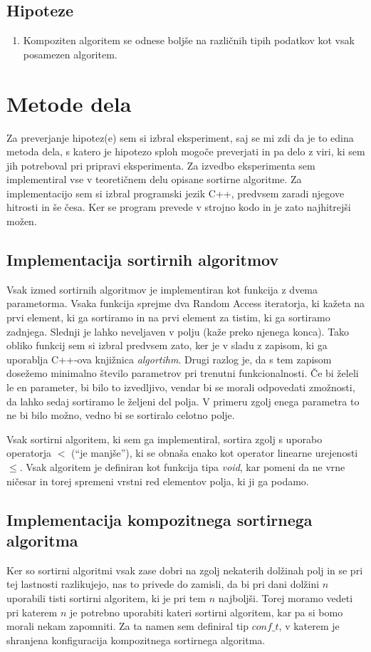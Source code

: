 \documentclass[a4paper,oneside]{article}
\begin{document}
\subsection{Hipoteze}
\begin{enumerate}
  \item Kompoziten algoritem se odnese boljše na različnih tipih podatkov kot vsak
    posamezen algoritem.
\end{enumerate}
\section{Metode dela}
Za preverjanje hipotez(e) sem si izbral eksperiment, saj se mi zdi da je to edina metoda
dela, s katero je hipotezo sploh mogoče preverjati in pa delo z viri, ki sem jih
potreboval pri pripravi eksperimenta.
Za izvedbo eksperimenta sem implementiral vse v teoretičnem delu opisane sortirne
algoritme. Za implementacijo sem si izbral programski jezik C++, predvsem zaradi njegove
hitrosti in še česa. Ker se program prevede v strojno kodo in je zato najhitrejši možen. %

\subsection{Implementacija sortirnih algoritmov}
Vsak izmed sortirnih algoritmov je implementiran kot funkcija z dvema parametorma.
Vsaka funkcija sprejme dva Random Access iteratorja, %
ki kažeta na prvi element, ki ga sortiramo in na prvi element za tistim, ki ga sortiramo
zadnjega. Slednji je lahko neveljaven v polju (kaže preko njenega konca).
Tako obliko funkcij sem si izbral predvsem zato, ker je v sladu z zapisom, ki ga uporablja
C++-ova knjižnica \emph{algortihm}. Drugi razlog je, da s tem zapisom dosežemo minimalno število
parametrov pri trenutni funkcionalnosti. Če bi želeli le en parameter, bi bilo to
izvedljivo, vendar bi se morali odpovedati zmožnosti, da lahko sedaj sortiramo le željeni
del polja. V primeru zgolj enega parametra to ne bi bilo možno, vedno bi se
sortiralo celotno polje.

Vsak sortirni algoritem, ki sem ga implementiral, sortira zgolj s uporabo operatorja $<$
(``je manjše''), ki se obnaša enako kot operator linearne urejenosti $\leq$. Vsak
algoritem je definiran kot funkcija tipa \emph{void}, kar pomeni da ne vrne ničesar in
torej spremeni vrstni red elementov polja, ki ji ga podamo.

\subsection{Implementacija kompozitnega sortirnega algoritma}
\label{chapter:tweaksort}
Ker so sortirni algoritmi vsak zase dobri na zgolj nekaterih dolžinah polj in se pri tej
lastnosti razlikujejo, nas to privede do zamisli, da bi pri dani dolžini $n$ uporabili tisti
sortirni algoritem, ki je pri tem $n$ najboljši. Torej moramo vedeti pri katerem $n$ je
potrebno uporabiti kateri sortirni algoritem, kar pa si bomo morali nekam zapomniti. Za ta
namen sem definiral tip $conf\_t$, v katerem je shranjena konfiguracija kompozitnega
sortirnega algoritma. 
\end{document}
